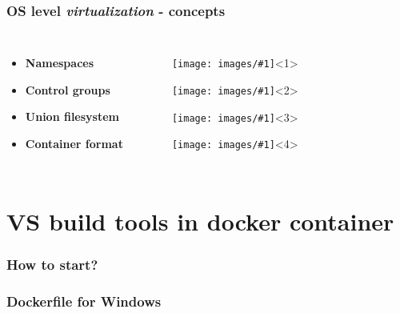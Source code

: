 \documentclass[aspectratio=169]{beamer}
\newcommand{\slidegraphic}[2]{
    \texttt{[image: images/\#1]}<#2>%
}
\newcommand{\imagesblock}[1]{
    \vspace*{\fill}
    \begin{figure}
        \begin{overlayarea}{\columnwidth}{3cm}
            \begin{center}
            #1
            \end{center}
        \end{overlayarea}
    \end{figure}
    \vspace*{\fill}
}
\begin{document}
\begin{frame}
    \frametitle{OS level \textit{virtualization} - concepts}
    
    \begin{columns}[c, onlytextwidth]

            \setlength{\partopsep}{0pt}
            \begin{itemize}
                \item \textbf<1>{Namespaces}%
                \item \textbf<2>{Control groups}%
                \item \textbf<3>{Union filesystem}%
                \item \textbf<4>{Container format}%
            \end{itemize}
                
        \imagesblock{
            \slidegraphic{namespaces}{1}%
            \slidegraphic{control-groups}{2}%
            \slidegraphic{union-filesystem}{3}%
            \slidegraphic{placeholder}{4}%
        }

    \end{columns}
\end{frame}

\section[VS build tools in docker container]{VS build tools in docker container}

\begin{frame}
\frametitle{How to start?}
\end{frame}

\begin{frame}
\frametitle{Dockerfile for Windows}
\end{frame}
\end{document}

